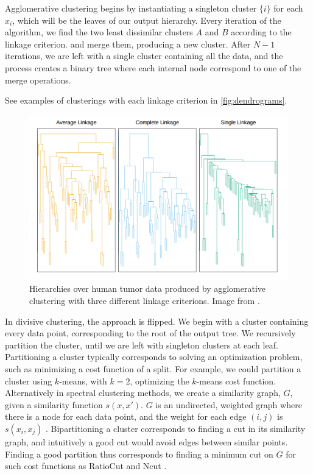 \documentclass{article}
\begin{document}
Agglomerative clustering begins by instantiating
a singleton cluster $\{i\}$ for each $x_i$, which
will be the leaves of our output hierarchy.
Every iteration of the algorithm, 
we find
the two least dissimilar clusters $A$ and $B$
according to the linkage criterion.
and merge them, producing a new cluster.
After $N - 1$ iterations, we are left
with a single cluster containing
all the data, and the process
creates a binary tree where each internal node
correspond to one of the merge operations.

See examples of clusterings with each
linkage criterion
in \autoref{fig:dendrograms}.


\begin{figure}[t]
  \includegraphics[width=\textwidth]{img/dendrograms}
  \caption{Hierarchies over human tumor data produced by agglomerative clustering
    with three different linkage criterions. 
  Image from \citep{Hastie2009}.}
\label{fig:dendrograms}
\end{figure}

In divisive clustering, the approach is flipped.
We begin with a cluster containing
every data point, corresponding
to the root of the output tree.
We recursively
partition the cluster, until 
we are left with singleton clusters
at each leaf.
Partitioning a cluster
typically corresponds to solving
an optimization problem, such as minimizing
a cost function of a split.
For example, we could partition
a cluster using $k$-means, with $k = 2$,
optimizing the $k$-means cost function.
Alternatively in spectral clustering methods,
we create a similarity graph, $G$,
given a similarity function $s(x, x')$.
$G$ is an undirected, weighted graph
where there is a node for each data point,
and the weight for each edge $(i, j)$ is
$s(x_i, x_j)$ \citep{VonLuxburg2007}.
Bipartitioning a cluster
corresponds to finding a cut in its similarity graph,
and intuitively a good cut would avoid
edges between similar points.
Finding a good partition thus corresponds
to finding a minimum cut on $G$
for such cost functions as
RatioCut \citep{Hagen1992} and Ncut \citep{Shi2000}.
\end{document}
